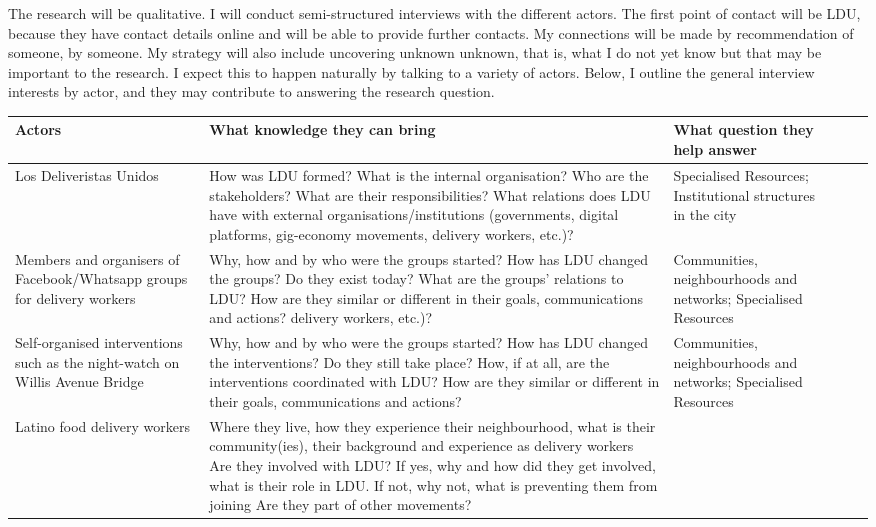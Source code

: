 \documentclass{article}
\begin{document}
The research will be qualitative. I will conduct semi-structured interviews with the different actors. The first point of contact will be LDU, because they have contact details online and will be able to provide further contacts. My connections will be made by recommendation of someone, by someone. My strategy will also include uncovering unknown unknown, that is, what I do not yet know but that may be important to the research. I expect this to happen naturally by talking to a variety of actors. Below, I outline the general interview interests by actor, and they may contribute to answering the research question.

\setlength\LTleft{-3cm}
\begin{longtable}{ Lp{.35\textwidth} Lp{.60\textwidth} Lp{.4\textwidth}}
\toprule
\textbf{Actors} & \textbf{What knowledge they can bring} & \textbf{What question they help answer}  \\
\midrule
Los Deliveristas Unidos & 
	How was LDU formed?
	What is the internal organisation?
	Who are the stakeholders? What are their responsibilities?
	What relations does LDU have with external organisations/institutions (governments, digital platforms, gig-economy movements, delivery workers, etc.)? &
	Specialised Resources; Institutional structures in the city \\ 
	\hline
	Members and organisers of Facebook/Whatsapp groups for delivery workers & 
		Why, how and by who were the groups started?
		How has LDU changed the groups? Do they exist today? What are the groups’ relations to LDU? How are they similar or different in their goals, communications and actions?
delivery workers, etc.)? &
	Communities, neighbourhoods and networks; Specialised Resources  \\ 
	\hline
	Self-organised interventions such as the night-watch on Willis Avenue Bridge &
	Why, how and by who were the groups started?
	How has LDU changed the interventions? Do they still take place? How, if at all, are the interventions coordinated with LDU? How are they similar or different in their goals, communications and actions?
	&
	Communities, neighbourhoods and networks; Specialised Resources  \\ 
	\hline
	Latino food delivery workers &
	Where they live, how they experience their neighbourhood, what is their community(ies), their background and experience as delivery workers
	Are they involved with LDU? If yes, why and how did they get involved, what is their role in LDU. If not, why not, what is preventing them from joining
	Are they part of other movements?

\end{longtable}
\end{document}
